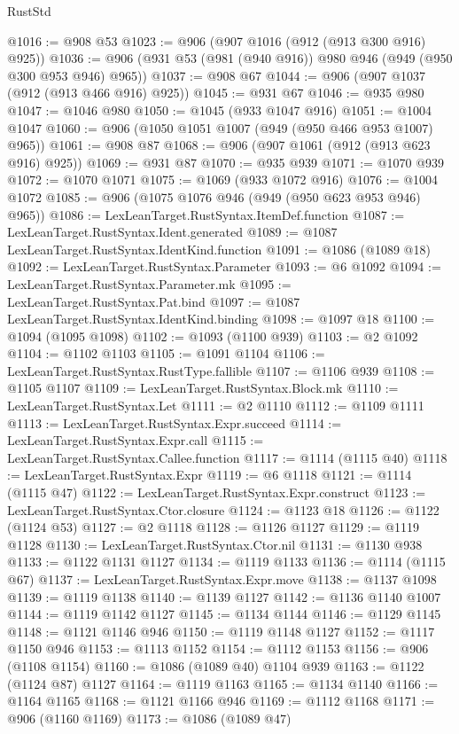 \begin{lexlean}{RustStd}
\begin{coremodule}
{\begin{coremodule}
{{{{{{{{{{{{{{{{{{{{{{{{{{{{{{{@1016 := @908 @53
@1023 := @906 (@907 @1016 (@912 (@913 @300 @916) @925))
@1036 := @906 (@931 @53 (@981 (@940 @916)) @980 @946 (@949 (@950 @300 @953 @946) @965))
@1037 := @908 @67
@1044 := @906 (@907 @1037 (@912 (@913 @466 @916) @925))
@1045 := @931 @67
@1046 := @935 @980
@1047 := @1046 @980
@1050 := @1045 (@933 @1047 @916)
@1051 := @1004 @1047
@1060 := @906 (@1050 @1051 @1007 (@949 (@950 @466 @953 @1007) @965))
@1061 := @908 @87
@1068 := @906 (@907 @1061 (@912 (@913 @623 @916) @925))
@1069 := @931 @87
@1070 := @935 @939
@1071 := @1070 @939
@1072 := @1070 @1071
@1075 := @1069 (@933 @1072 @916)
@1076 := @1004 @1072
@1085 := @906 (@1075 @1076 @946 (@949 (@950 @623 @953 @946) @965))
@1086 := LexLeanTarget.RustSyntax.ItemDef.function
@1087 := LexLeanTarget.RustSyntax.Ident.generated
@1089 := @1087 LexLeanTarget.RustSyntax.IdentKind.function
@1091 := @1086 (@1089 @18)
@1092 := LexLeanTarget.RustSyntax.Parameter
@1093 := @6 @1092
@1094 := LexLeanTarget.RustSyntax.Parameter.mk
@1095 := LexLeanTarget.RustSyntax.Pat.bind
@1097 := @1087 LexLeanTarget.RustSyntax.IdentKind.binding
@1098 := @1097 @18
@1100 := @1094 (@1095 @1098)
@1102 := @1093 (@1100 @939)
@1103 := @2 @1092
@1104 := @1102 @1103
@1105 := @1091 @1104
@1106 := LexLeanTarget.RustSyntax.RustType.fallible
@1107 := @1106 @939
@1108 := @1105 @1107
@1109 := LexLeanTarget.RustSyntax.Block.mk
@1110 := LexLeanTarget.RustSyntax.Let
@1111 := @2 @1110
@1112 := @1109 @1111
@1113 := LexLeanTarget.RustSyntax.Expr.succeed
@1114 := LexLeanTarget.RustSyntax.Expr.call
@1115 := LexLeanTarget.RustSyntax.Callee.function
@1117 := @1114 (@1115 @40)
@1118 := LexLeanTarget.RustSyntax.Expr
@1119 := @6 @1118
@1121 := @1114 (@1115 @47)
@1122 := LexLeanTarget.RustSyntax.Expr.construct
@1123 := LexLeanTarget.RustSyntax.Ctor.closure
@1124 := @1123 @18
@1126 := @1122 (@1124 @53)
@1127 := @2 @1118
@1128 := @1126 @1127
@1129 := @1119 @1128
@1130 := LexLeanTarget.RustSyntax.Ctor.nil
@1131 := @1130 @938
@1133 := @1122 @1131 @1127
@1134 := @1119 @1133
@1136 := @1114 (@1115 @67)
@1137 := LexLeanTarget.RustSyntax.Expr.move
@1138 := @1137 @1098
@1139 := @1119 @1138
@1140 := @1139 @1127
@1142 := @1136 @1140 @1007
@1144 := @1119 @1142 @1127
@1145 := @1134 @1144
@1146 := @1129 @1145
@1148 := @1121 @1146 @946
@1150 := @1119 @1148 @1127
@1152 := @1117 @1150 @946
@1153 := @1113 @1152
@1154 := @1112 @1153
@1156 := @906 (@1108 @1154)
@1160 := @1086 (@1089 @40) @1104 @939
@1163 := @1122 (@1124 @87) @1127
@1164 := @1119 @1163
@1165 := @1134 @1140
@1166 := @1164 @1165
@1168 := @1121 @1166 @946
@1169 := @1112 @1168
@1171 := @906 (@1160 @1169)
@1173 := @1086 (@1089 @47)
}}}}}}}}}}}}}}}}}}}}}}}}}}}}}}}
\end{coremodule}}
\end{coremodule}
\end{lexlean}
